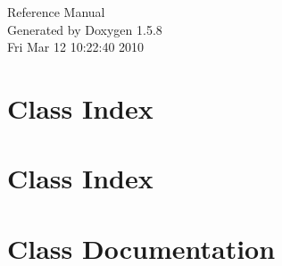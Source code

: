 \documentclass[a4paper]{book}
\begin{document}
\begin{titlepage}
\vspace*{7cm}
\begin{center}
{\Large Reference Manual}\\
\vspace*{1cm}
{\large Generated by Doxygen 1.5.8}\\
\vspace*{0.5cm}
{\small Fri Mar 12 10:22:40 2010}\\
\end{center}
\end{titlepage}
\clearemptydoublepage
{}
\tableofcontents
\clearemptydoublepage
{}
\chapter{Class Index}

\chapter{Class Index}

\chapter{Class Documentation}






































\printindex
\end{document}
